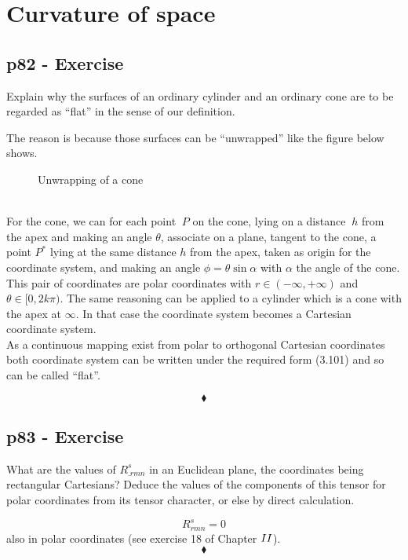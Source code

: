 \chapter{Curvature of space}
\pagebreak[4]
\section{p82 - Exercise}
\begin{tcolorbox}
Explain why the surfaces of an ordinary cylinder and an ordinary cone are to be regarded as ``flat'' in the sense of our definition.
\end{tcolorbox}
The reason is because those surfaces can be ``unwrapped'' like the figure below shows. 
\begin{figure}[h]


\caption{Unwrapping of a cone}
\end{figure}\\
For the cone, we can for each point $\ P $ on the cone, lying on a distance $\ h $ from the apex and making an angle $\theta $,  associate on a plane, tangent to the cone,  a  point $ P^* $ lying at the same  distance $ h $ from the apex, taken as origin for the coordinate system, and making an angle $\phi =  \theta \sin{\alpha} $ with $ \alpha $ the angle of the cone. This pair of coordinates are polar coordinates with $ r \in (-\infty, + \infty)$ and $\theta \in [0, 2k\pi)$. 
The same reasoning can be applied to a cylinder which is a cone with the apex at $\infty$. In that case the coordinate system becomes a Cartesian coordinate system. \\
As a continuous mapping exist from polar to orthogonal Cartesian coordinates both  coordinate system can be written under the required form (3.101) and so can be called ``flat''.

$$\blacklozenge$$
\newpage

\section{p83 - Exercise}
\begin{tcolorbox}
What are the values of $R^s_{.rmn}$ in an Euclidean plane, the coordinates being rectangular Cartesians? Deduce the values of the components of this tensor for polar coordinates from its tensor character, or else by direct calculation.
\end{tcolorbox}
$$R^s_{rmn}=0$$
also in polar coordinates (see exercise 18 of Chapter $\RomanNumeralCaps{2}$).
$$\blacklozenge$$
\newpage

